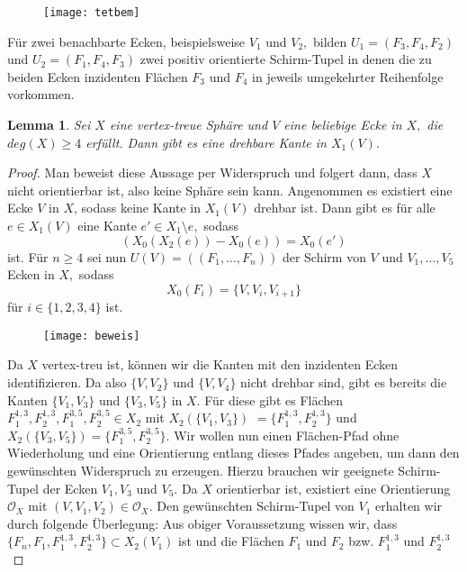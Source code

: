 \documentclass[12pt,titlepage,twoside,cleardoublepage]{article}
\theoremstyle{nummermitklammern}
\newtheorem{lemma}[temp]{Lemma}
\newtheorem{lemma}[zahl]{Lemma}
\numberwithin{equation}{section}
\begin{document}
\begin{figure}[H]
\begin{center}
\texttt{[image: tetbem]}
\end{center}
\end{figure} 
Für zwei benachbarte Ecken, beispielsweise $V_1$ und $V_2,$ bilden $U_1=(F_3,F_4,F_2)$ und $U_2=(F_1,F_4,F_3)$ zwei positiv orientierte Schirm-Tupel in denen die zu beiden Ecken inzidenten Flächen $F_3$ und $F_4$ in jeweils umgekehrter Reihenfolge vorkommen.
\begin{lemma}
Sei $X$ eine vertex-treue Sphäre und $V$ eine beliebige Ecke in $X,$ die $deg(X)\geq 4$ erfüllt. Dann gibt es eine drehbare Kante in $X_1(V).$ 
\end{lemma}
\begin{proof}
Man beweist diese Aussage per Widerspruch und folgert dann, dass $X$ nicht orientierbar ist, also keine Sphäre sein kann.
Angenommen es existiert eine Ecke $V$ in $X$, sodass keine Kante in $X_1(V)$ drehbar ist. Dann gibt es für alle $e\in X_1(V)$ eine Kante $e'\in X_1\setminus{e},$ sodass 
\[
(X_0(X_2(e))-X_0(e))=X_0(e')
\]
ist.
Für $n\geq 4$ sei nun $U(V)=((F_1,\ldots,F_n))$ der Schirm von $V$ und $V_1,\ldots,V_5$ Ecken in $X,$ sodass  
\[
X_0(F_i)=\{V,V_i,V_{i+1}\}
\] 
für $i\in\{1,2,3,4\}$ ist.
\begin{figure}[H]
\begin{center}
\texttt{[image: beweis]}
\end{center}
\end{figure} 
 Da $X$ vertex-treu ist, können wir die Kanten mit den inzidenten Ecken identifizieren. Da also $\{V,V_2\}$ und $\{V,V_4\}$ nicht drehbar sind, gibt es bereits die Kanten $\{V_1,V_3\}$ und $\{V_3,V_5\}$ in $X$. Für diese gibt es  Flächen $F^{1,3}_1,F^{1,3}_2,F^{3,5}_1,F^{3,5}_2\in X_2$ mit $X_2(\{V_1,V_3\})$ $=\{F^{1,3}_1,F^{1,3}_2\}$ und $X_2(\{V_3,V_5\})=\{F^{3,5}_1,F^{3,5}_2\}$. Wir wollen nun einen Flächen-Pfad ohne Wiederholung und eine Orientierung entlang dieses Pfades angeben, um dann den gewünschten Widerspruch zu erzeugen. Hierzu brauchen wir geeignete Schirm-Tupel der Ecken $V_1,V_3$ und $V_5.$ 
Da $X$ orientierbar ist, existiert eine Orientierung $\mathcal{O}_X$ mit $(V,V_1,V_2)\in \mathcal{O}_X.$
Den gewünschten Schirm-Tupel von $V_1$ erhalten wir durch folgende Überlegung: 
Aus obiger Voraussetzung wissen wir, dass $\{F_n,F_1,F_1^{1,3},F_2^{1,3}\}\subset X_2(V_1)$ ist und die Flächen $F_1$ und $F_2$ bzw. $F^{1,3}_1$ und $F^{1,3}_2$

\end{proof}
\end{document}
